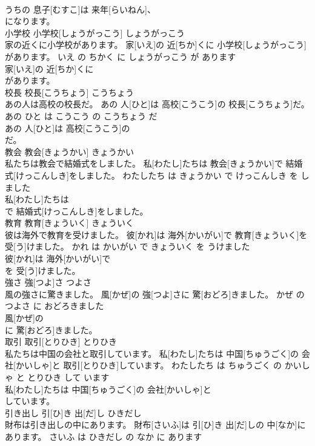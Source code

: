 \documentclass[8pt]{extreport}
\begin{document}
\begin{CJK}{UTF8}{min}
\\	うちの 息子[むすこ]は 来年[らいねん]、
\\	になります。			
\\	小学校	小学校[しょうがっこう]	しょうがっこう	
\\	家の近くに小学校があります。	家[いえ]の 近[ちか]くに 小学校[しょうがっこう]があります。	いえ の ちかく に しょうがっこう が あります	
\\	家[いえ]の 近[ちか]くに
\\	があります。			
\\	校長	校長[こうちょう]	こうちょう	
\\	あの人は高校の校長だ。	あの 人[ひと]は 高校[こうこう]の 校長[こうちょう]だ。	あの ひと は こうこう の こうちょう だ	
\\	あの 人[ひと]は 高校[こうこう]の
\\	だ。			
\\	教会	教会[きょうかい]	きょうかい	
\\	私たちは教会で結婚式をしました。	私[わたし]たちは 教会[きょうかい]で 結婚式[けっこんしき]をしました。	わたしたち は きょうかい で けっこんしき を しました	
\\	私[わたし]たちは
\\	で 結婚式[けっこんしき]をしました。			
\\	教育	教育[きょういく]	きょういく	
\\	彼は海外で教育を受けました。	彼[かれ]は 海外[かいがい]で 教育[きょういく]を 受[う]けました。	かれ は かいがい で きょういく を うけました	
\\	彼[かれ]は 海外[かいがい]で
\\	を 受[う]けました。			
\\	強さ	強[つよ]さ	つよさ	
\\	風の強さに驚きました。	風[かぜ]の 強[つよ]さに 驚[おどろ]きました。	かぜ の つよさ に おどろきました	
\\	風[かぜ]の
\\	に 驚[おどろ]きました。			
\\	取引	取引[とりひき]	とりひき	
\\	私たちは中国の会社と取引しています。	私[わたし]たちは 中国[ちゅうごく]の 会社[かいしゃ]と 取引[とりひき]しています。	わたしたち は ちゅうごく の かいしゃ と とりひき して います	
\\	私[わたし]たちは 中国[ちゅうごく]の 会社[かいしゃ]と
\\	しています。			
\\	引き出し	引[ひ]き 出[だ]し	ひきだし	
\\	財布は引き出しの中にあります。	財布[さいふ]は 引[ひ]き 出[だ]しの 中[なか]にあります。	さいふ は ひきだし の なか に あります	

\end{CJK}
\end{document}
